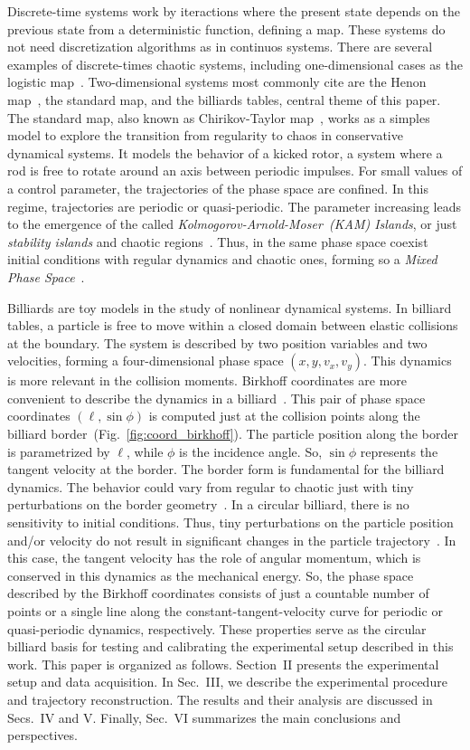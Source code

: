\documentclass[pdflatex,sn-mathphys-num,iicol]{sn-jnl}%
\theoremstyle{thmstyleone}%
\theoremstyle{thmstyletwo}%
\theoremstyle{thmstylethree}%
\begin{document}
Discrete-time systems work by iteractions where the present state depends on the previous state from a deterministic function, defining a map. These systems do not need discretization algorithms as in continuos systems. There are several examples of discrete-times chaotic systems, including one-dimensional cases as the logistic map~\cite{pnp:2006}. Two-dimensional systems most commonly cite are the Henon map~\cite{bmc:1991}, the standard map, and the billiards tables, central theme of this paper. The standard map, also known as Chirikov-Taylor map~\cite{chi:1979}, works as a simples model to explore the transition from regularity to chaos in conservative dynamical systems. It models the behavior of a kicked rotor, a system where a rod is free to rotate around an axis between periodic impulses. For small values of a control parameter, the trajectories of the phase space are confined. In this regime, trajectories are periodic or quasi-periodic. The parameter increasing leads to the emergence of the called \textit{Kolmogorov-Arnold-Moser~(KAM) Islands}, or just \textit{stability islands} and chaotic regions~\cite{chi:1979,ott:2002}. Thus, in the same phase space coexist initial conditions with regular dynamics and chaotic ones, forming so a \textit{Mixed Phase Space}~\cite{ree:1999,ara:2015,ara:2024,qui:2025}.

Billiards are toy models in the study of nonlinear dynamical systems. In billiard tables, a particle is free to move within a closed domain between elastic collisions at the boundary. The system is described by two position variables and two velocities, forming a four-dimensional phase space $(x,y,v_x,v_y)$. This dynamics is more relevant in the collision moments. Birkhoff coordinates are more convenient to describe the dynamics in a billiard~\cite{bir:2020}. This pair of phase space coordinates $(\ell,\sin\phi)$ is computed just at the collision points along the billiard border~(Fig.~\ref{fig:coord_birkhoff}). The particle position along the border is parametrized by $\ell$, while $\phi$ is the incidence angle. So, $\sin\phi$ represents the tangent velocity at the border. The border form is fundamental for the billiard dynamics. The behavior could vary from regular to chaotic just with tiny perturbations on the border geometry~\cite{leo:2019}. In a circular billiard, there is no sensitivity to initial conditions. Thus, tiny perturbations on the particle position and/or velocity do not result in significant changes in the particle trajectory~\cite{dre:1998}. In this case, the tangent velocity has the role of angular momentum, which is conserved in this dynamics as the mechanical energy. So, the phase space described by the Birkhoff coordinates consists of just a countable number of points or a single line along the constant-tangent-velocity curve for periodic or quasi-periodic dynamics, respectively. These properties serve as the circular billiard basis for testing and calibrating the experimental setup described in this work. This paper is organized as follows. Section~II presents the experimental setup and data acquisition. In Sec.~III, we describe the experimental procedure and trajectory reconstruction. The results and their analysis are discussed in Secs.~IV and V. Finally, Sec.~VI summarizes the main conclusions and perspectives.
\end{document}

